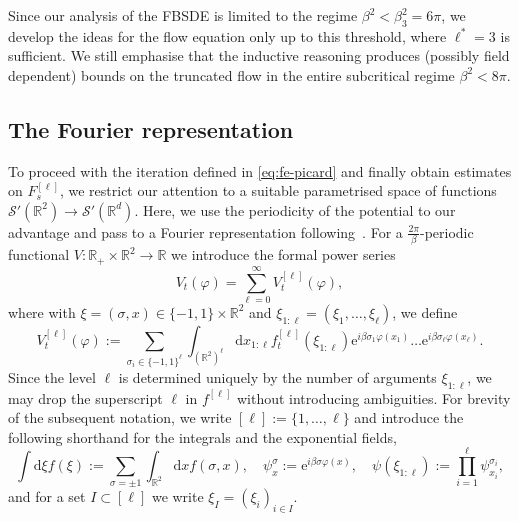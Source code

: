 \documentclass[11pt, a4paper]{scrartcl}
\numberwithin{equation}{section}
\theoremstyle{plain}
\theoremstyle{remark}
\newcommand{\assign}{:=}
\newcommand{\mathd}{\mathrm{d}}
\newcommand{\mathe}{\mathrm{e}}
\begin{document}
Since our analysis of the FBSDE is limited to the regime $\beta^2 < \beta_3^2
= 6 \pi$, we develop the ideas for the flow equation only up to this
threshold, where $\ell^{\ast} = 3$ is sufficient. We still emphasise that the
inductive reasoning produces (possibly field dependent) bounds on the
truncated flow in the entire subcritical regime $\beta^2 < 8 \pi$.

\subsection{The Fourier representation}

To proceed with the iteration defined in \eqref{eq:fe-picard} and finally
obtain estimates on $F_s^{[\ell]}$, we restrict our attention to a suitable
parametrised space of functions $\mathcal{S}' (\mathbb{R}^2) \rightarrow
\mathcal{S}' (\mathbb{R}^d)$. Here, we use the periodicity of the potential to
our advantage and pass to a Fourier representation
following~{\cite{brydgesMayerExpansionsHamiltonJacobi1987}}. For a $\frac{2
\pi}{\beta}$-periodic functional $V : \mathbb{R}_+ \times \mathbb{R}^2
\rightarrow \mathbb{R}$ we introduce the formal power series
\begin{equation}
  V_t (\varphi) = \sum_{\ell = 0}^{\infty} V_t^{[\ell]} (\varphi),
  \label{eq:formal-fourier}
\end{equation}
where with $\xi = (\sigma, x) \in \{ - 1, 1 \} \times \mathbb{R}^2$ and
$\xi_{1 : \ell} = (\xi_1, \ldots, \xi_{\ell})$, we define
\begin{equation}
  V_t^{[\ell]} (\varphi) \assign \sum_{\sigma_i \in \{ - 1, 1 \}^{\ell}}
  \int_{(\mathbb{R}^2)^{\ell}} \mathd x_{1 : \ell} f_t^{[\ell]} (\xi_{1 :
  \ell}) \mathe^{i \beta \sigma_1 \varphi (x_1)} \ldots \mathe^{i \beta
  \sigma_{\ell} \varphi (x_{\ell})} . \label{eq:fourier-rep-V}
\end{equation}
Since the level $\ell$ is determined uniquely by the number of arguments
$\xi_{1 : \ell}$, we may drop the superscript $\ell$ in $f^{[\ell]}$ without
introducing ambiguities. For brevity of the subsequent notation, we write
$[\ell]:=\{1,\dots,\ell\}$ and introduce
the following shorthand for the integrals and the exponential fields,
\[
     \int \mathd \xi f (\xi) \assign \sum_{\sigma = \pm 1} \int_{\mathbb{R}^2}
     \mathd xf (\sigma, x),  \quad \psi_x^{\sigma} \assign \mathe^{i \beta
     \sigma \varphi (x)}, \quad  \psi (\xi_{1 : \ell}) \assign \prod_{i =
     1}^{\ell} \psi_{x_i}^{\sigma_i},
\]
and for a set $I\subset [\ell]$ we write $\xi_I=(\xi_i)_{i\in I}$.
\end{document}
